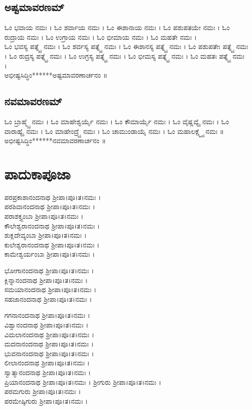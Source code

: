\subsection{ಅಷ್ಟಮಾವರಣಮ್}
ಓಂ ಭವಾಯ ನಮಃ ।
ಓಂ ಶರ್ವಾಯ ನಮಃ ।
ಓಂ ಈಶಾನಾಯ ನಮಃ ।
ಓಂ ಪಶುಪತಯೇ ನಮಃ ।
ಓಂ ರುದ್ರಾಯ ನಮಃ ।
ಓಂ ಉಗ್ರಾಯ ನಮಃ ।
ಓಂ ಭೀಮಾಯ ನಮಃ ।
ಓಂ ಮಹತೇ ನಮಃ ।\\
ಓಂ ಭವಸ್ಯ ಪತ್ನ್ಯೈ ನಮಃ ।
ಓಂ ಶರ್ವಸ್ಯ ಪತ್ನ್ಯೈ ನಮಃ ।
ಓಂ ಈಶಾನಸ್ಯ ಪತ್ನ್ಯೈ ನಮಃ ।
ಓಂ ಪಶುಪತೇಃ ಪತ್ನ್ಯೈ ನಮಃ ।
ಓಂ ರುದ್ರಸ್ಯ ಪತ್ನ್ಯೈ ನಮಃ ।
ಓಂ ಉಗ್ರಸ್ಯ ಪತ್ನ್ಯೈ ನಮಃ ।
ಓಂ ಭೀಮಸ್ಯ ಪತ್ನ್ಯೈ ನಮಃ ।
ಓಂ ಮಹತಃ ಪತ್ನ್ಯೈ ನಮಃ ।\\
ಅಭೀಷ್ಟಸಿದ್ಧಿಂ******ಅಷ್ಟಮಾವರಣಾರ್ಚನಂ ॥
\subsection{ನವಮಾವರಣಮ್}
ಓಂ ಬ್ರಾಹ್ಮ್ಯೈ ನಮಃ । ಓಂ ಮಾಹೇಶ್ವರ್ಯೈ ನಮಃ । ಓಂ ಕೌಮಾರ್ಯೈ ನಮಃ । ಓಂ ವೈಷ್ಣವ್ಯೈ ನಮಃ । ಓಂ ವಾರಾಹ್ಯೈ ನಮಃ । ಓಂ ಮಾಹೇಂದ್ರ್ಯೈ ನಮಃ । ಓಂ ಚಾಮುಂಡಾಯೈ ನಮಃ । ಓಂ ಮಹಾಲಕ್ಷ್ಮ್ಯೈ ನಮಃ ॥\\
ಅಭೀಷ್ಟಸಿದ್ಧಿಂ******ನವಮಾವರಣಾರ್ಚನಂ ॥
\newpage
\section{ಪಾದುಕಾಪೂಜಾ}

ಪರಪ್ರಕಾಶಾನಂದನಾಥ ಶ್ರೀಪಾ।ಪೂ।ತ।ನಮಃ ।\\
ಪರಶಿವಾನಂದನಾಥ ಶ್ರೀಪಾ।ಪೂ।ತ।ನಮಃ ।\\
ಪರಾಶಕ್ತ್ಯಂಬಾ ಶ್ರೀಪಾ।ಪೂ।ತ।ನಮಃ ।\\
ಕೌಲೇಶ್ವರಾನಂದನಾಥ ಶ್ರೀಪಾ।ಪೂ।ತ।ನಮಃ ।\\
ಶುಕ್ಲದೇವ್ಯಂಬಾ ಶ್ರೀಪಾ।ಪೂ।ತ।ನಮಃ ।\\
ಕುಲೇಶ್ವರಾನಂದನಾಥ ಶ್ರೀಪಾ।ಪೂ।ತ।ನಮಃ ।\\
ಕಾಮೇಶ್ವರ್ಯಂಬಾ ಶ್ರೀಪಾ।ಪೂ।ತ।ನಮಃ ।

ಭೋಗಾನಂದನಾಥ ಶ್ರೀಪಾ।ಪೂ।ತ।ನಮಃ ।\\
ಕ್ಲಿನ್ನಾನಂದನಾಥ ಶ್ರೀಪಾ।ಪೂ।ತ।ನಮಃ ।\\
ಸಮಯಾನಂದನಾಥ ಶ್ರೀಪಾ।ಪೂ।ತ।ನಮಃ ।\\
ಸಹಜಾನಂದನಾಥ ಶ್ರೀಪಾ।ಪೂ।ತ।ನಮಃ ।

ಗಗನಾನಂದನಾಥ ಶ್ರೀಪಾ।ಪೂ।ತ।ನಮಃ ।\\
ವಿಶ್ವಾನಂದನಾಥ ಶ್ರೀಪಾ।ಪೂ।ತ।ನಮಃ ।\\
ವಿಮಲಾನಂದನಾಥ ಶ್ರೀಪಾ।ಪೂ।ತ।ನಮಃ ।\\
ಮದನಾನಂದನಾಥ ಶ್ರೀಪಾ।ಪೂ।ತ।ನಮಃ ।\\
ಭುವನಾನಂದನಾಥ ಶ್ರೀಪಾ।ಪೂ।ತ।ನಮಃ ।\\
ಲೀಲಾನಂದನಾಥ ಶ್ರೀಪಾ।ಪೂ।ತ।ನಮಃ ।\\
ಸ್ವಾತ್ಮಾನಂದನಾಥ ಶ್ರೀಪಾ।ಪೂ।ತ।ನಮಃ ।\\
ಪ್ರಿಯಾನಂದನಾಥ ಶ್ರೀಪಾ।ಪೂ।ತ।ನಮಃ ।
\newpage
ಶ್ರೀಗುರು ಶ್ರೀಪಾ।ಪೂ।ತ।ನಮಃ ।\\
ಪರಮಗುರು ಶ್ರೀಪಾ।ಪೂ।ತ।ನಮಃ ।\\
ಪರಮೇಷ್ಠಿಗುರು ಶ್ರೀಪಾ।ಪೂ।ತ।ನಮಃ ।

